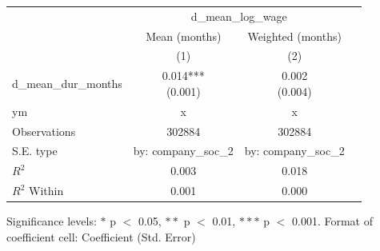 \renewcommand\cellalign{t}
\begin{threeparttable}
\begin{tabular}{lccc}
\toprule
 & \multicolumn{2}{c}{d_mean_log_wage} \\
\cmidrule(lr){2-3} 
 & Mean (months) & Weighted (months) \\
 & (1) & (2) \\
\midrule
\addlinespace
d_mean_dur_months & \makecell{0.014*** \\ (0.001)} & \makecell{0.002 \\ (0.004)} \\
\midrule
\addlinespace
ym & x & x \\
\midrule
\addlinespace
Observations & 302884 & 302884 \\
S.E. type & by: company_soc_2 & by: company_soc_2 \\
$R^2$ & 0.003 & 0.018 \\
$R^2$ Within & 0.001 & 0.000 \\
\bottomrule
\end{tabular}
\footnotesize Significance levels: $*$ p $<$ 0.05, $**$ p $<$ 0.01, $***$ p $<$ 0.001. Format of coefficient cell: Coefficient 
 (Std. Error)
\end{threeparttable}